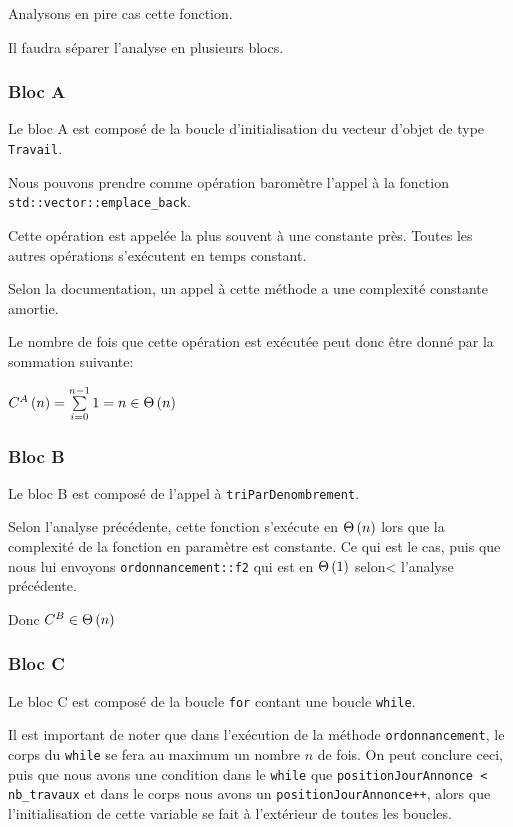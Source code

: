 \documentclass[class=article]{standalone}
\begin{document}
Analysons en pire cas cette fonction.

Il faudra séparer l'analyse en plusieurs blocs.

\subsubsection*{Bloc A}

Le bloc A est composé de la boucle d'initialisation du vecteur d'objet de type \lstinline{Travail}.

Nous pouvons prendre comme opération baromètre l'appel à la fonction \lstinline{std::vector::emplace_back}.

Cette opération est appelée la plus souvent à une constante près. Toutes les autres opérations s'exécutent en temps constant.

Selon la documentation, un appel à cette méthode a une complexité constante amortie.

Le nombre de fois que cette opération est exécutée peut donc être donné par la sommation suivante:

$C^A\left ( n \right ) = \sum\limits_{i=0}^{n-1}1 = n \in \Theta\left ( n \right )$

\subsubsection*{Bloc B}

Le bloc B est composé de l'appel à \lstinline{triParDenombrement}.

Selon l'analyse précédente, cette fonction s'exécute en $\Theta\left ( n \right )$
lors que la complexité de la fonction en paramètre est constante. Ce qui est le cas,
puis que nous lui envoyons \lstinline{ordonnancement::f2} qui est en $\Theta\left ( 1 \right )$ selon<
l'analyse précédente.

Donc $C^B \in \Theta\left ( n \right )$

\subsubsection*{Bloc C}

Le bloc C est composé de la boucle \lstinline{for} contant une boucle \lstinline{while}.

Il est important de noter que dans l'exécution de la méthode \lstinline{ordonnancement},
le corps du \lstinline{while} se fera au maximum un nombre $n$ de fois. On peut conclure ceci,
puis que nous avons une condition dans le \lstinline{while} que 
\lstinline{positionJourAnnonce < nb_travaux} et dans le corps nous avons un \lstinline{positionJourAnnonce++},
alors que l'initialisation de cette variable se fait à l'extérieur de toutes les boucles.
\end{document}
